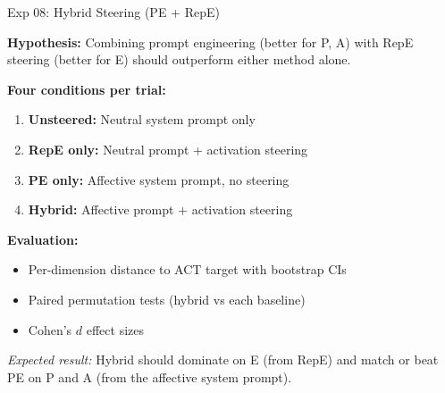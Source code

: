 \documentclass[aspectratio=169,11pt]{beamer}
\begin{document}
\begin{frame}{Exp 08: Hybrid Steering (PE + RepE)}

\textbf{Hypothesis:} Combining prompt engineering (better for P, A) with
RepE steering (better for E) should outperform either method alone.

\bigskip

\textbf{Four conditions per trial:}
\begin{enumerate}
    \item \textbf{Unsteered:} Neutral system prompt only
    \item \textbf{RepE only:} Neutral prompt + activation steering
    \item \textbf{PE only:} Affective system prompt, no steering
    \item \textbf{Hybrid:} Affective prompt + activation steering
\end{enumerate}

\bigskip

\textbf{Evaluation:}
\begin{itemize}
    \item Per-dimension distance to ACT target with bootstrap CIs
    \item Paired permutation tests (hybrid vs each baseline)
    \item Cohen's $d$ effect sizes
\end{itemize}

\bigskip

\textit{Expected result:} Hybrid should dominate on E (from RepE) and match
or beat PE on P and A (from the affective system prompt).
\end{frame}
\end{document}
